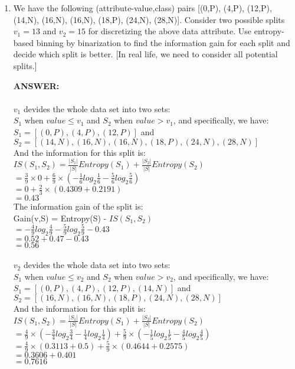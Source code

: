 \documentclass{article}
\begin{document}
\begin{enumerate}
\item We have the following (attribute-value,class) pairs [(0,P), (4,P),
(12,P), (14,N), (16,N), (16,N), (18,P), (24,N), (28,N)]. Consider two
possible splits $v_1 = 13$ and $v_2 = 15$ for discretizing the above data
attribute. Use entropy-based binning by binarization to find the
information gain for each split and decide which split is better. [In
real life, we need to consider all potential splits.]

\textbf{ANSWER:} \\
 \\
$v_1$ devides the whole data set into two sets: \\
$S_1$ when $value \leq v_1$ and $S_2$ when $value > v_1$, and
specifically, we have: \\ 
$S_1 = [(0,P), (4,P), (12,P)]$ and $S_2 = [(14,N), (16,N), (16,N),
(18,P), (24,N), (28,N)]$ \\
And the information for this split is: \\
$IS(S_1,S_2) = \frac{|S_1|}{|S|}Entropy(S_1) +
\frac{|S_2|}{|S|}Entropy(S_2)$ \\
$= \frac{3}{9}\times 0 + \frac{6}{9}\times (-\frac{1}{6}log_2\frac{1}{6}
- \frac{5}{6}log_2\frac{5}{6})$ \\
$= 0 + \frac{2}{3}\times (0.4309 + 0.2191)$ \\
$= 0.43$ \\ 
The information gain of the split is: \\ 
Gain(v,S) = Entropy(S) - $IS(S_1,S_2)$ \\
$= -\frac{4}{9}log_2\frac{4}{9} - \frac{5}{9}log_2\frac{5}{9} - 0.43$ \\
$= 0.52 + 0.47 - 0.43$\\
$= 0.56$ \\

 \\
$v_2$ devides the whole data set into two sets: \\
$S_1$ when $value \leq v_2$ and $S_2$ when $value > v_2$, and
specifically, we have: \\ 
$S_1 = [(0,P), (4,P), (12,P), (14,N)]$ and $S_2 = [(16,N), (16,N),
(18,P), (24,N), (28,N)]$ \\
And the information for this split is: \\
$IS(S_1,S_2) = \frac{|S_1|}{|S|}Entropy(S_1) +
\frac{|S_2|}{|S|}Entropy(S_2)$ \\
$= \frac{4}{9}\times (-\frac{3}{4}log_2\frac{3}{4} - \frac{1}{4}log_2\frac{1}{4}) +
\frac{5}{9}\times (-\frac{1}{5}log_2\frac{1}{5} - \frac{4}{5}log_2\frac{4}{5})$ \\
$= \frac{4}{9}\times (0.3113 + 0.5) + \frac{5}{9}\times (0.4644 + 0.2575)$ \\
$= 0.3606 + 0.401$ \\ 
$= 0.7616$


\end{enumerate}
\end{document}
